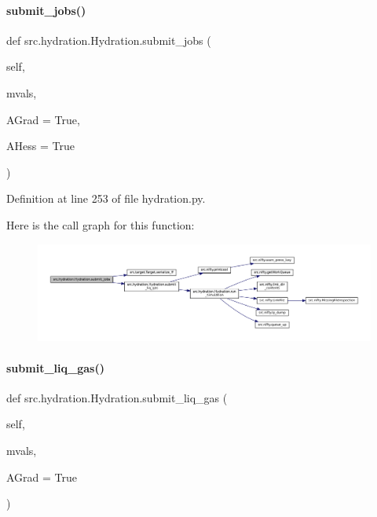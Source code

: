 \paragraph{\texorpdfstring{submit\+\_\+jobs()}{submit\_jobs()}}
{\footnotesize\ttfamily def src.\+hydration.\+Hydration.\+submit\+\_\+jobs (\begin{DoxyParamCaption}\item[{}]{self,  }\item[{}]{mvals,  }\item[{}]{A\+Grad = {\ttfamily True},  }\item[{}]{A\+Hess = {\ttfamily True} }\end{DoxyParamCaption})}



Definition at line 253 of file hydration.\+py.

Here is the call graph for this function\+:
\nopagebreak
\begin{figure}[H]
\begin{center}
\leavevmode
\includegraphics[width=350pt]{classsrc_1_1hydration_1_1Hydration_a09b7d661320caa13bf94b198e4293156_cgraph}
\end{center}
\end{figure}
\mbox{\label{classsrc_1_1hydration_1_1Hydration_a7eb7a345cb235a28828b51fc092902c2}} 
\paragraph{\texorpdfstring{submit\+\_\+liq\+\_\+gas()}{submit\_liq\_gas()}}
{\footnotesize\ttfamily def src.\+hydration.\+Hydration.\+submit\+\_\+liq\+\_\+gas (\begin{DoxyParamCaption}\item[{}]{self,  }\item[{}]{mvals,  }\item[{}]{A\+Grad = {\ttfamily True} }\end{DoxyParamCaption})}



